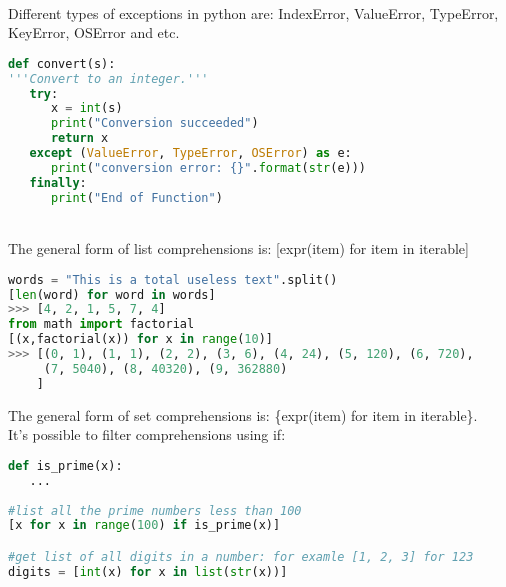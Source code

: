 \begin{note}[Exceptions]\\
	Different types of exceptions in python are: IndexError, ValueError, TypeError, KeyError, OSError and etc.
\begin{lstlisting}[language = {python}]
def convert(s):
'''Convert to an integer.'''
   try:
      x = int(s)
      print("Conversion succeeded")
      return x
   except (ValueError, TypeError, OSError) as e:
      print("conversion error: {}".format(str(e)))
   finally:	
      print("End of Function")
\end{lstlisting}

\end{note}
\begin{note}[Comprehensions]\\
The general form of list comprehensions is: [expr(item) for item in iterable]
\begin{lstlisting}[language = {python}]
words = "This is a total useless text".split()
[len(word) for word in words]
>>> [4, 2, 1, 5, 7, 4]
from math import factorial
[(x,factorial(x)) for x in range(10)]
>>> [(0, 1), (1, 1), (2, 2), (3, 6), (4, 24), (5, 120), (6, 720),
     (7, 5040), (8, 40320), (9, 362880)
    ]
\end{lstlisting}
The general form of set comprehensions is: \{expr(item) for item in iterable\}.\\
It's possible to filter comprehensions using if:
\begin{lstlisting}[language = {python}]
def is_prime(x):
   ...
   
#list all the prime numbers less than 100
[x for x in range(100) if is_prime(x)]

#get list of all digits in a number: for examle [1, 2, 3] for 123
digits = [int(x) for x in list(str(x))]
\end{lstlisting}
\end{note}